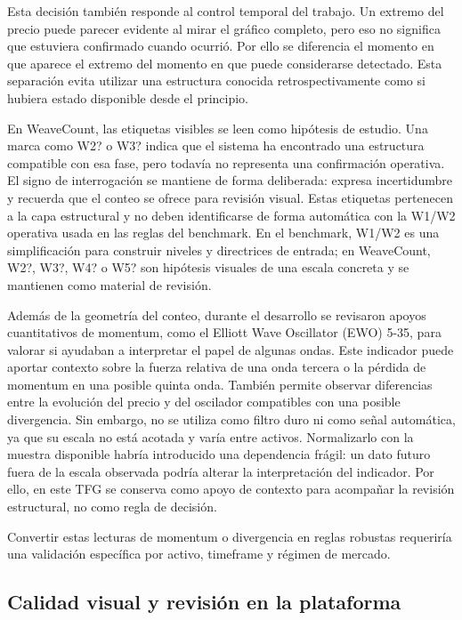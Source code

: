 Esta decisi\'on tambi\'en responde al control temporal del trabajo. Un extremo del
precio puede parecer evidente al mirar el gr\'afico completo, pero eso no
significa que estuviera confirmado cuando ocurri\'o. Por ello se diferencia el
momento en que aparece el extremo del momento en que puede considerarse
detectado. Esta separaci\'on evita utilizar una estructura conocida
retrospectivamente como si hubiera estado disponible desde el principio.

En WeaveCount, las etiquetas visibles se leen como hip\'otesis de estudio. Una
marca como W2? o W3? indica que el sistema ha encontrado una estructura
compatible con esa fase, pero todav\'ia no representa una confirmaci\'on
operativa. El signo de interrogaci\'on se mantiene de forma deliberada: expresa
incertidumbre y recuerda que el conteo se ofrece para revisi\'on visual.
Estas etiquetas pertenecen a la capa estructural y no deben identificarse de
forma autom\'atica con la W1/W2 operativa usada en las reglas del benchmark. En
el benchmark, W1/W2 es una simplificaci\'on para construir niveles y directrices
de entrada; en WeaveCount, W2?, W3?, W4? o W5? son hip\'otesis visuales de una
escala concreta y se mantienen como material de revisi\'on.

Adem\'as de la geometr\'ia del conteo, durante el desarrollo se revisaron apoyos
cuantitativos de momentum, como el Elliott Wave Oscillator (EWO) 5-35, para
valorar si ayudaban a interpretar el papel de algunas ondas. Este indicador
puede aportar contexto
sobre la fuerza relativa de una onda tercera o la p\'erdida de momentum en una
posible quinta onda. Tambi\'en permite observar diferencias entre la evoluci\'on
del precio y del oscilador compatibles con una posible divergencia. Sin embargo,
no se utiliza como filtro duro ni como se\~nal autom\'atica, ya que su escala no
est\'a acotada y var\'ia entre activos. Normalizarlo con la muestra disponible
habr\'ia introducido una dependencia fr\'agil: un dato futuro fuera de la escala
observada podr\'ia alterar la interpretaci\'on del indicador. Por ello, en este
TFG se conserva como apoyo de contexto para acompa\~nar la revisi\'on estructural,
no como regla de decisi\'on.

Convertir estas lecturas de momentum o divergencia en reglas robustas requerir\'ia
una validaci\'on espec\'ifica por activo, timeframe y r\'egimen de mercado.

\subsection{Calidad visual y revisi\'on en la plataforma}
\label{subsec:calidad-visual-plataforma}

